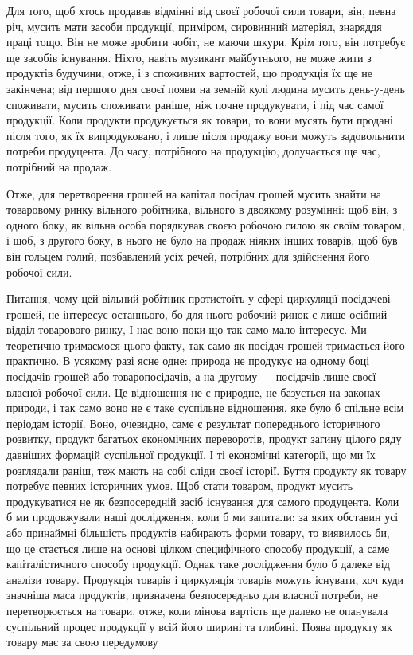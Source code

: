 Для того, щоб хтось продавав відмінні від своєї робочої сили
товари, він, певна річ, мусить мати засоби продукції, приміром,
сировинний матеріял, знаряддя праці тощо. Він не може зробити
чобіт, не маючи шкури. Крім того, він потребує ще засобів існування.
Ніхто, навіть музикант майбутнього, не може жити з
продуктів будучини, отже, і з споживних вартостей, що продукція
їх ще не закінчена; від першого дня своєї появи на земній
кулі людина мусить день-у-день споживати, мусить споживати
раніше, ніж почне продукувати, і під час самої продукції. Коли
продукти продукується як товари, то вони мусять бути продані
після того, як їх випродуковано, і лише після продажу вони
можуть задовольнити потреби продуцента. До часу, потрібного
на продукцію, долучається ще час, потрібний на продаж.

Отже, для перетворення грошей на капітал посідач грошей
мусить знайти на товаровому ринку вільного робітника, вільного
в двоякому розумінні: щоб він, з одного боку, як вільна особа
порядкував своєю робочою силою як своїм товаром, і щоб, з
другого боку, в нього не було на продаж ніяких інших товарів,
щоб був він гольцем голий, позбавлений усіх речей, потрібних
для здійснення його робочої сили.

Питання, чому цей вільний робітник протистоїть у сфері
циркуляції посідачеві грошей, не інтересує останнього, бо для
нього робочий ринок є лише осібний відділ товарового ринку,
І нас воно поки що так само мало інтересує. Ми теоретично тримаємося
цього факту, так само як посідач грошей тримається
його практично. В усякому разі ясне одне: природа не продукує
на одному боці посідачів грошей або товаропосідачів, а на другому
— посідачів лише своєї власної робочої сили. Це відношення
не є природне, не базується на законах природи, і так само воно
не є таке суспільне відношення, яке було б спільне всім періодам
історії. Воно, очевидно, саме є результат попереднього історичного
розвитку, продукт багатьох економічних переворотів, продукт
загину цілого ряду давніших формацій суспільної продукції.
І ті економічні категорії, що ми їх розглядали раніш, теж
мають на собі сліди своєї історії. Буття продукту як товару
потребує певних історичних умов. Щоб стати товаром, продукт
мусить продукуватися не як безпосередній засіб існування для
самого продуцента. Коли б ми продовжували наші дослідження,
коли б ми запитали: за яких обставин усі або принаймні більшість
продуктів набирають форми товару, то виявилось би, що це
стається лише на основі цілком специфічного способу продукції,
а саме капіталістичного способу продукції. Однак таке дослідження
було б далеке від аналізи товару. Продукція товарів і циркуляція
товарів можуть існувати, хоч куди значніша маса продуктів,
призначена безпосередньо для власної потреби, не перетворюється
на товари, отже, коли мінова вартість ще далеко не
опанувала суспільний процес продукції у всій його ширині та
глибині. Поява продукту як товару має за свою передумову
